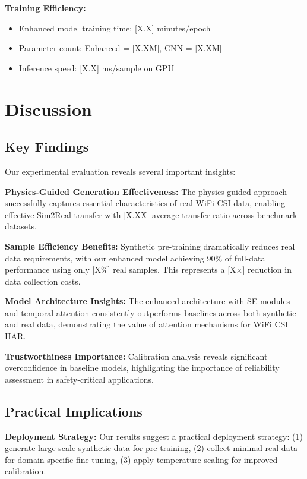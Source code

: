 \documentclass[journal]{IEEEtran}
\begin{document}
\textbf{Training Efficiency:}
\begin{itemize}
\item Enhanced model training time: [X.X] minutes/epoch
\item Parameter count: Enhanced = [X.XM], CNN = [X.XM]
\item Inference speed: [X.X] ms/sample on GPU
\end{itemize}

\section{Discussion}

\subsection{Key Findings}

Our experimental evaluation reveals several important insights:

\textbf{Physics-Guided Generation Effectiveness:} The physics-guided approach successfully captures essential characteristics of real WiFi CSI data, enabling effective Sim2Real transfer with [X.XX] average transfer ratio across benchmark datasets.

\textbf{Sample Efficiency Benefits:} Synthetic pre-training dramatically reduces real data requirements, with our enhanced model achieving 90\% of full-data performance using only [X\%] real samples. This represents a [X×] reduction in data collection costs.

\textbf{Model Architecture Insights:} The enhanced architecture with SE modules and temporal attention consistently outperforms baselines across both synthetic and real data, demonstrating the value of attention mechanisms for WiFi CSI HAR.

\textbf{Trustworthiness Importance:} Calibration analysis reveals significant overconfidence in baseline models, highlighting the importance of reliability assessment in safety-critical applications.

\subsection{Practical Implications}

\textbf{Deployment Strategy:} Our results suggest a practical deployment strategy: (1) generate large-scale synthetic data for pre-training, (2) collect minimal real data for domain-specific fine-tuning, (3) apply temperature scaling for improved calibration.
\end{document}
